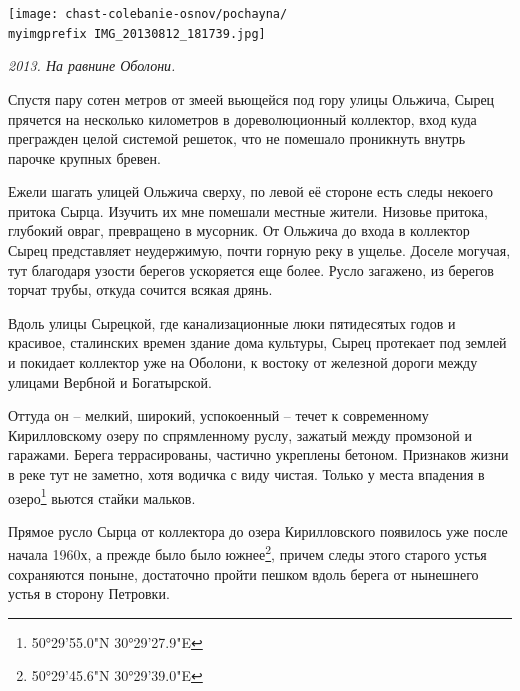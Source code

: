 \begin{center}
\texttt{[image: chast-colebanie-osnov/pochayna/\\myimgprefix IMG\_20130812\_181739.jpg]}

\textit{2013. На равнине Оболони.}
\end{center}

\newpage

Спустя пару сотен метров от змеей вьющейся под гору улицы Ольжича, Сырец прячется на несколько километров в дореволюционный коллектор, вход куда прегражден целой системой решеток, что не помешало проникнуть внутрь парочке крупных бревен.

Ежели шагать улицей Ольжича сверху, по левой её стороне есть следы некоего притока Сырца. Изучить их мне помешали местные жители. Низовье притока, глубокий овраг, превращено в мусорник. От Ольжича до входа в коллектор Сырец представляет неудержимую, почти горную реку в ущелье. Доселе могучая, тут благодаря узости берегов ускоряется еще более. Русло загажено, из берегов торчат трубы, откуда сочится всякая дрянь. 

Вдоль улицы Сырецкой, где канализационные люки пятидесятых годов и красивое, сталинских времен здание дома культуры, Сырец протекает под землей и покидает коллектор уже на Оболони, к востоку от железной дороги между улицами Вербной и Богатырской.

Оттуда он – мелкий, широкий, успокоенный – течет к современному Кирилловскому озеру по спрямленному руслу, зажатый между промзоной и гаражами. Берега террасированы, частично укреплены бетоном. Признаков жизни в реке тут не заметно, хотя водичка с виду чистая. Только у места впадения в озеро\footnote{50°29'55.0"N 30°29'27.9"E} вьются стайки мальков.

Прямое русло Сырца от коллектора до озера Кирилловского появилось уже после начала 1960х, а прежде было было южнее\footnote{50°29'45.6"N 30°29'39.0"E}, причем следы этого старого устья сохраняются поныне, достаточно пройти пешком вдоль берега от нынешнего устья в сторону Петровки.




